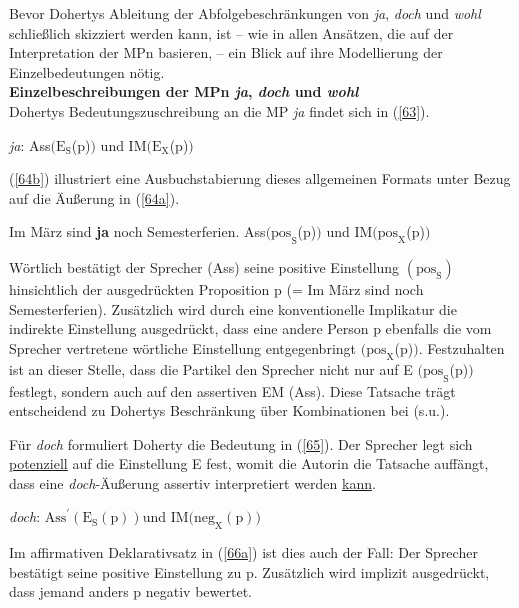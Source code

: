 Bevor Dohertys Ableitung der Abfolgebeschränkungen von \textit{ja}, \textit{doch} und \textit{wohl} schließlich skizziert werden kann, ist – wie in allen Ansätzen, die auf der Interpretation der MPn basieren, – ein Blick auf ihre Modellierung der Einzelbedeutungen nötig.\\

\noindent
\textbf{Einzelbeschreibungen der MPn \textit{ja}, \textit{doch} und \textit{wohl}}\\
Dohertys Bedeutungszuschreibung an die MP \textit{ja} findet sich in (\ref{63}).

\begin{exe}
	\ex\label{63} 
		\textit{ja}: Ass$(\textrm{E}_{\textrm{S}}$(\textrm{p})$)$ und I\textrm{M}$(\textrm{E}_{\textrm{X}}$(\textrm{p})$)$
		\hfill\hbox {\citet[80]{Doherty1985}}
\end{exe}
(\ref{64b}) illustriert eine Ausbuchstabierung dieses allgemeinen Formats unter Bezug auf die Äußerung in (\ref{64a}).

\begin{exe}
	\ex\label{64} 
		\begin{xlist}	
			\ex\label{64a} Im März sind \textbf{ja} noch Semesterferien.
			\ex\label{64b} Ass$\textrm{(pos}_{\textrm{S}}$(\textrm{p})$)$ und IM$(\textrm{pos}_{\textrm{X}}$(\textrm{p})$)$
		\end{xlist}
\end{exe}
Wörtlich bestätigt der Sprecher (Ass) seine positive Einstellung $(\textrm{pos}_{\textrm{S}})$ hinsichtlich der ausgedrückten Proposition p (= Im März sind noch Semesterferien). Zu\-sätzlich wird durch eine konventionelle Implikatur die indirekte Einstellung ausgedrückt, dass eine andere Person p ebenfalls die vom Sprecher vertretene wörtliche Einstellung entgegenbringt $(\textrm{pos}_{\textrm{X}}$(\textrm{p})$)$. Festzuhalten ist an dieser Stelle, dass die Partikel den Sprecher nicht nur auf E $\textrm{(pos}_{\textrm{S}}$(\textrm{p})$)$ festlegt, sondern auch auf den assertiven EM (Ass). Diese Tatsache trägt entscheidend zu Dohertys Beschränkung über Kombinationen bei (s.u.).

Für \textit{doch} formuliert Doherty die Bedeutung in (\ref{65}). Der Sprecher legt sich \underline{potenziell} auf die Einstellung E fest, womit die Autorin die Tatsache auffängt, dass eine \textit{doch}-Äußerung assertiv interpretiert werden \underline{kann}.

\begin{exe}
	\ex\label{65} 
	\textit{doch}: $\textrm{Ass}^{\prime} (\textrm{E}_{\textrm{S}}(\textrm{p})) \textrm{und IM(neg}_{\textrm{X}}(\textrm{p}))$	
	\hfill\hbox {\citet[71]{Doherty1985}}
\end{exe}
Im affirmativen Deklarativsatz in (\ref{66a}) ist dies auch der Fall: Der Sprecher bestätigt seine positive Einstellung zu p. Zusätzlich wird implizit ausgedrückt, dass jemand anders p negativ bewertet. 

